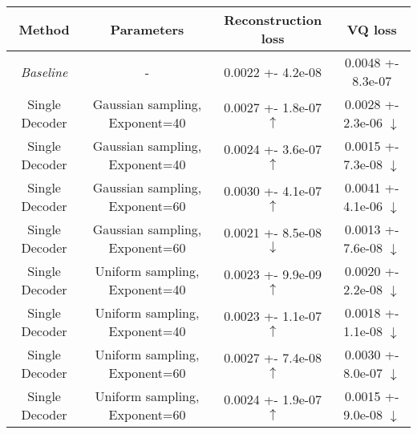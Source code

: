 \centering
\scriptsize
\begin{tabular}{||c|c|c|c||}
\hline
 Method & Parameters & Reconstruction loss & VQ loss \\
\hline
\textit{Baseline} & - & 0.0022 +- 4.2e-08 & 0.0048 +- 8.3e-07 \\
\hline
Single Decoder & Gaussian sampling, Exponent=40 & 0.0027 +- 1.8e-07  $\uparrow$ & 0.0028 +- 2.3e-06  $\downarrow$ \\
\hline
Single Decoder & Gaussian sampling, Exponent=40 & 0.0024 +- 3.6e-07  $\uparrow$ & 0.0015 +- 7.3e-08  $\downarrow$ \\
\hline
Single Decoder & Gaussian sampling, Exponent=60 & 0.0030 +- 4.1e-07  $\uparrow$ & 0.0041 +- 4.1e-06  $\downarrow$ \\
\hline
Single Decoder & Gaussian sampling, Exponent=60 & 0.0021 +- 8.5e-08  \textbf{$\downarrow$} & 0.0013 +- 7.6e-08  \textbf{$\downarrow$} \\
\hline
Single Decoder & Uniform sampling, Exponent=40 & 0.0023 +- 9.9e-09  $\uparrow$ & 0.0020 +- 2.2e-08  $\downarrow$ \\
\hline
Single Decoder & Uniform sampling, Exponent=40 & 0.0023 +- 1.1e-07  $\uparrow$ & 0.0018 +- 1.1e-08  $\downarrow$ \\
\hline
Single Decoder & Uniform sampling, Exponent=60 & 0.0027 +- 7.4e-08  $\uparrow$ & 0.0030 +- 8.0e-07  $\downarrow$ \\
\hline
Single Decoder & Uniform sampling, Exponent=60 & 0.0024 +- 1.9e-07  $\uparrow$ & 0.0015 +- 9.0e-08  $\downarrow$ \\
\hline
\end{tabular}
